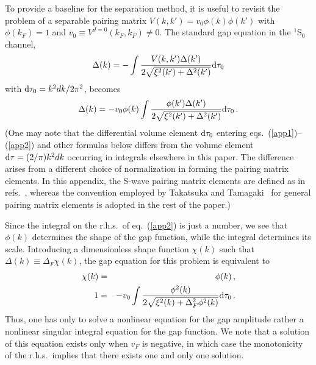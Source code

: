 To provide a baseline for the separation method, it is useful to
revisit the problem of a separable pairing matrix
$V(k,k') = v_0 \phi(k) \phi(k')$
with $\phi(k_F)=1$ and $v_0\equiv V^{J=0}(k_F,k_F) \neq 0$.  The
standard gap equation in the $^1$S$_0$ channel,
\begin{equation}
\Delta(k) = - \int \frac{ V(k,k') \Delta(k') } {2\sqrt{\xi^2(k')
+ \Delta^2(k')}} {\rm d}\tau_0  \label{app1}
\end{equation}
with ${\rm d}\tau_0 = k^2 dk /2\pi^2$,
becomes
\begin{equation}
\Delta(k) = - v_0\phi(k)\int  \frac{ \phi(k')\Delta(k')  }
{2\sqrt{\xi^2(k') + \Delta^2(k')}}{\rm d}\tau_0
        \, .\label{app2}
\end{equation}
(One may note that the differential volume element ${\rm d} \tau_0$ 
entering eqs.~(\ref{app1})--(\ref{app2}) and other formulas below 
differs from the volume element ${\rm d} \tau = (2/\pi)k^2 dk$ occurring in 
integrals elsewhere in this paper.  The difference arises from
a different choice of normalization in forming the pairing matrix 
elements.  In this appendix, the S-wave pairing matrix elements are 
defined as in refs.~\cite{kkc,luso}, whereas the convention employed 
by Takatsuka and Tamagaki~\cite{ttr} for general pairing matrix elements 
is adopted in the rest of the paper.)

Since the integral on the r.h.s.\ of eq.~(\ref{app2}) is just a number,
we see that $\phi(k)$ determines the shape of the gap function, while
the integral determines its scale.  Introducing a dimensionless shape
function $\chi(k)$ such that $\Delta(k)\equiv \Delta_F \chi(k)$,
the gap equation for this problem is equivalent to
\begin{eqnarray}
\chi(k) & = & \phi(k)  \, , \\
1 & = & - v_0
	\int  \frac{\phi^2(k)}
	{2\sqrt{\xi^2(k) + \Delta_F^2 \phi^2(k)}}{\rm d}\tau_0	\, .
\end{eqnarray}
Thus, one has only to solve a nonlinear equation for the
gap amplitude rather a nonlinear singular integral equation
for the gap function.   We note that a solution of this equation
exists only when $v_F$ is negative, in which case the
monotonicity of the r.h.s.\ implies that there exists one
and only one solution.

